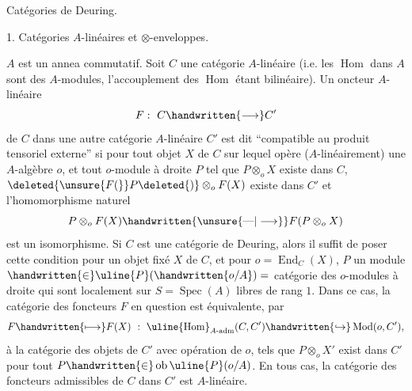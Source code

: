 Catégories de Deuring.

1. Catégories $A$-linéaires et $\otimes$-enveloppes.

$A$ est un annea commutatif. Soit $C$ une catégorie $A$-linéaire (i.e. les $\operatorname{Hom}$ dans $A$ sont des $A$-modules, l'accouplement des $\operatorname{Hom}$ étant bilinéaire). Un oncteur $A$-linéaire
\[
F:\ C\handwritten{\longrightarrow}C'
\]
de $C$ dans une autre catégorie $A$-linéaire $C'$ est dit  ``compatible au produit tensoriel externe'' si pour tout objet $X$ de $C$ sur lequel opère ($A$-linéairement) une $A$-algèbre $o$, et tout $o$-module à droite $P$ tel que $P\otimes_o X$ existe dans $C$, $\deleted{\unsure{F(}}P\deleted{)}\otimes_o F(X)$ existe dans $C'$ et l'homomorphisme naturel
\[
P\otimes_o F(X)\handwritten{\unsure{\text{---}|\longrightarrow}}F(P\otimes_o X)
\]
est un isomorphisme. Si $C$ est une catégorie de Deuring, alors il suffit de poser cette condition pour un objet fixé $X$ de $C$, et pour $o=\operatorname{End}_C(X)$, $P$ un module $\handwritten{\in}\uline{P}(\handwritten{o/A})=$ catégorie des $o$-modules à droite qui sont localement sur $S=\operatorname{Spec}(A)$ libres de rang $1$. Dans ce cas, la catégorie des foncteurs $F$ en question est équivalente, par
\[
F\handwritten{\longmapsto}F(X)\ :\ \uline{\operatorname{Hom}}_{A\text{-}\mathrm{adm}}(C,C')\handwritten{\hookrightarrow}\operatorname{Mod}(o,C'),
\]
à la catégorie des objets  de $C'$ avec opération de $o$, tels que $P\otimes_o X'$ exist dans $C'$ pour tout $P\handwritten{\in}\operatorname{ob}\uline{P}(o/A)$. En tous cas, la catégorie des foncteurs admissibles de $C$ dans $C'$ est $A$-linéaire.

